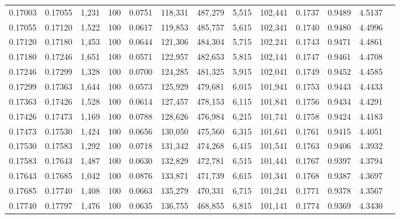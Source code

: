 \begin{tabular}{rrrrrrrrrrrrr}
0.17003 & 0.17055 & 1,231 & 100 &                                     0.0751 & 118,331 & 487,279 &   5,515 & 102,441 & 0.1737 & 0.9489 & 4.5137 \\
0.17055 & 0.17120 & 1,522 & 100 &                                     0.0617 & 119,853 & 485,757 &   5,615 & 102,341 & 0.1740 & 0.9480 & 4.4996 \\
0.17120 & 0.17180 & 1,453 & 100 &                                     0.0644 & 121,306 & 484,304 &   5,715 & 102,241 & 0.1743 & 0.9471 & 4.4861 \\
0.17180 & 0.17246 & 1,651 & 100 &                                     0.0571 & 122,957 & 482,653 &   5,815 & 102,141 & 0.1747 & 0.9461 & 4.4708 \\
0.17246 & 0.17299 & 1,328 & 100 &                                     0.0700 & 124,285 & 481,325 &   5,915 & 102,041 & 0.1749 & 0.9452 & 4.4585 \\
0.17299 & 0.17363 & 1,644 & 100 &                                     0.0573 & 125,929 & 479,681 &   6,015 & 101,941 & 0.1753 & 0.9443 & 4.4433 \\
0.17363 & 0.17426 & 1,528 & 100 &                                     0.0614 & 127,457 & 478,153 &   6,115 & 101,841 & 0.1756 & 0.9434 & 4.4291 \\
0.17426 & 0.17473 & 1,169 & 100 &                                     0.0788 & 128,626 & 476,984 &   6,215 & 101,741 & 0.1758 & 0.9424 & 4.4183 \\
0.17473 & 0.17530 & 1,424 & 100 &                                     0.0656 & 130,050 & 475,560 &   6,315 & 101,641 & 0.1761 & 0.9415 & 4.4051 \\
0.17530 & 0.17583 & 1,292 & 100 &                                     0.0718 & 131,342 & 474,268 &   6,415 & 101,541 & 0.1763 & 0.9406 & 4.3932 \\
0.17583 & 0.17643 & 1,487 & 100 &                                     0.0630 & 132,829 & 472,781 &   6,515 & 101,441 & 0.1767 & 0.9397 & 4.3794 \\
0.17643 & 0.17685 & 1,042 & 100 &                                     0.0876 & 133,871 & 471,739 &   6,615 & 101,341 & 0.1768 & 0.9387 & 4.3697 \\
0.17685 & 0.17740 & 1,408 & 100 &                                     0.0663 & 135,279 & 470,331 &   6,715 & 101,241 & 0.1771 & 0.9378 & 4.3567 \\
0.17740 & 0.17797 & 1,476 & 100 &                                     0.0635 & 136,755 & 468,855 &   6,815 & 101,141 & 0.1774 & 0.9369 & 4.3430 \\

\end{tabular}
